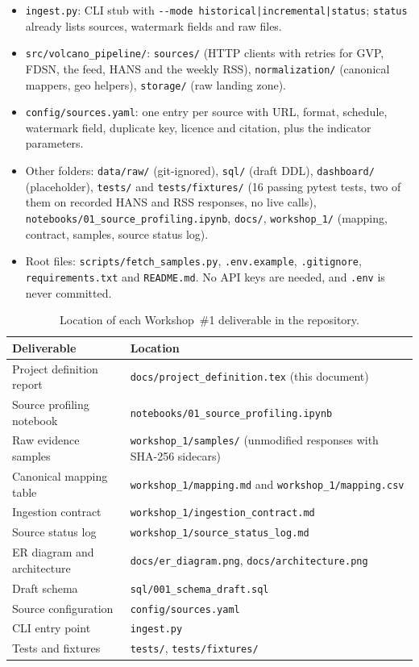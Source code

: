 \documentclass[11pt,a4paper]{article}
\begin{document}
\begin{itemize}
  \item \texttt{ingest.py}: CLI stub with
  \texttt{-{}-mode historical|incremental|status}; \texttt{status} already lists
  sources, watermark fields and raw files.
  \item \texttt{src/volcano\_pipeline/}: \texttt{sources/} (HTTP clients with retries
  for GVP, FDSN, the feed, HANS and the weekly RSS), \texttt{normalization/}
  (canonical mappers, geo helpers), \texttt{storage/} (raw landing zone).
  \item \texttt{config/sources.yaml}: one entry per source with URL, format, schedule,
  watermark field, duplicate key, licence and citation, plus the indicator parameters.
  \item Other folders: \texttt{data/raw/} (git-ignored), \texttt{sql/} (draft DDL),
  \texttt{dashboard/} (placeholder), \texttt{tests/} and \texttt{tests/fixtures/}
  (16 passing pytest tests, two of them on recorded HANS and RSS responses, no live
  calls), \texttt{notebooks/01\_source\_profiling.ipynb}, \texttt{docs/},
  \texttt{workshop\_1/} (mapping, contract, samples, source status log).
  \item Root files: \texttt{scripts/fetch\_samples.py}, \texttt{.env.example},
  \texttt{.gitignore}, \texttt{requirements.txt} and \texttt{README.md}. No API keys
  are needed, and \texttt{.env} is never committed.
\end{itemize}

\begin{table}[h]
\centering
\small
\setlength{\tabcolsep}{5pt}
\caption{Location of each Workshop~\#1 deliverable in the repository.}
\label{tab:deliverables}
\begin{tabular}{@{}L{5.0cm}L{10.0cm}@{}}
\toprule
\textbf{Deliverable} & \textbf{Location} \\
\midrule
Project definition report & \texttt{docs/project\_definition.tex} (this document) \\
Source profiling notebook & \texttt{notebooks/01\_source\_profiling.ipynb} \\
Raw evidence samples & \texttt{workshop\_1/samples/} (unmodified responses with SHA-256 sidecars) \\
Canonical mapping table & \texttt{workshop\_1/mapping.md} and \texttt{workshop\_1/mapping.csv} \\
Ingestion contract & \texttt{workshop\_1/ingestion\_contract.md} \\
Source status log & \texttt{workshop\_1/source\_status\_log.md} \\
ER diagram and architecture & \texttt{docs/er\_diagram.png}, \texttt{docs/architecture.png} \\
Draft schema & \texttt{sql/001\_schema\_draft.sql} \\
Source configuration & \texttt{config/sources.yaml} \\
CLI entry point & \texttt{ingest.py} \\
Tests and fixtures & \texttt{tests/}, \texttt{tests/fixtures/} \\
\bottomrule
\end{tabular}
\end{table}
\end{document}
